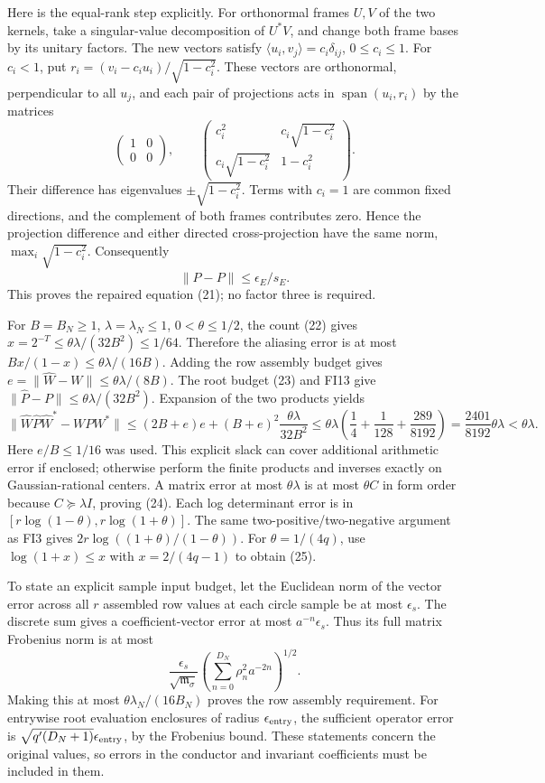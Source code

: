\documentclass[11pt]{article}
\begin{document}
Here is the equal-rank step explicitly. For orthonormal frames \(U,V\) of the two kernels, take a singular-value decomposition of \(U^*V\), and change both frame bases by its unitary factors. The new vectors satisfy \(\langle u_i,v_j\rangle=c_i\delta_{ij}\), \(0\le c_i\le1\). For \(c_i<1\), put \(r_i=(v_i-c_i u_i)/\sqrt{1-c_i^2}\). These vectors are orthonormal, perpendicular to all \(u_j\), and each pair of projections acts in \(\operatorname{span}(u_i,r_i)\) by the matrices \[
 \begin{pmatrix}1&0\\0&0\end{pmatrix},\qquad
 \begin{pmatrix}c_i^2&c_i\sqrt{1-c_i^2}\\c_i\sqrt{1-c_i^2}&1-c_i^2\end{pmatrix}.
\] Their difference has eigenvalues \(\pm\sqrt{1-c_i^2}\). Terms with \(c_i=1\) are common fixed directions, and the complement of both frames contributes zero. Hence the projection difference and either directed cross-projection have the same norm, \(\max_i\sqrt{1-c_i^2}\). Consequently \[
 \|\widehat P-P\|\le\epsilon_E/s_E.\tag{FI13}
\] This proves the repaired equation (21); no factor three is required.

For \(B=B_N\ge1\), \(\lambda=\lambda_N\le1\), \(0<\theta\le1/2\), the count (22) gives \(x=2^{-T}\le\theta\lambda/(32B^2)\le1/64\). Therefore the aliasing error is at most \(Bx/(1-x)\le\theta\lambda/(16B)\). Adding the row assembly budget gives \(e=\|\widehat W-W\|\le\theta\lambda/(8B)\). The root budget (23) and FI13 give \(\|\widehat P-P\|\le\theta\lambda/(32B^2)\). Expansion of the two products yields \[
 \|\widehat W\widehat P\widehat W^*-WPW^*\|
 \le(2B+e)e+(B+e)^2\frac{\theta\lambda}{32B^2}
 \le\theta\lambda\left(\frac14+\frac1{128}+\frac{289}{8192}\right)
 =\frac{2401}{8192}\theta\lambda<\theta\lambda.
 \tag{FI14}
\] Here \(e/B\le1/16\) was used. This explicit slack can cover additional arithmetic error if enclosed; otherwise perform the finite products and inverses exactly on Gaussian-rational centers. A matrix error at most \(\theta\lambda\) is at most \(\theta C\) in form order because \(C\succeq\lambda I\), proving (24). Each log determinant error is in \([r\log(1-\theta),r\log(1+\theta)]\). The same two-positive/two-negative argument as FI3 gives \(2r\log((1+\theta)/(1-\theta))\). For \(\theta=1/(4q)\), use \(\log(1+x)\le x\) with \(x=2/(4q-1)\) to obtain (25).

To state an explicit sample input budget, let the Euclidean norm of the vector error across all \(r\) assembled row values at each circle sample be at most \(\epsilon_s\). The discrete sum gives a coefficient-vector error at most \(a^{-n}\epsilon_s\). Thus its full matrix Frobenius norm is at most \[
 \frac{\epsilon_s}{\sqrt{\mathfrak m_\sigma}}
 \left(\sum_{n=0}^{D_N}\rho_n^2a^{-2n}\right)^{1/2}.
 \tag{FI15}
\] Making this at most \(\theta\lambda_N/(16B_N)\) proves the row assembly requirement. For entrywise root evaluation enclosures of radius \(\epsilon_{\rm entry}\), the sufficient operator error is \(\sqrt{q'(D_N+1)}\epsilon_{\rm entry}\), by the Frobenius bound. These statements concern the original values, so errors in the conductor and invariant coefficients must be included in them.
\end{document}
